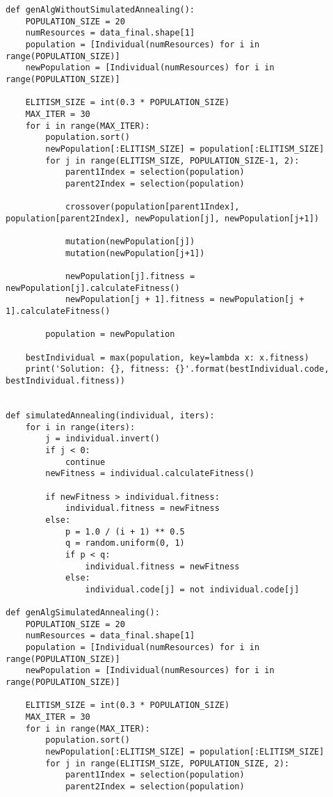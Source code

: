\documentclass[11pt]{article} %
\begin{document}
\begin{lstlisting}
def genAlgWithoutSimulatedAnnealing():
    POPULATION_SIZE = 20
    numResources = data_final.shape[1]
    population = [Individual(numResources) for i in range(POPULATION_SIZE)]
    newPopulation = [Individual(numResources) for i in range(POPULATION_SIZE)]

    ELITISM_SIZE = int(0.3 * POPULATION_SIZE)
    MAX_ITER = 30
    for i in range(MAX_ITER):
        population.sort()
        newPopulation[:ELITISM_SIZE] = population[:ELITISM_SIZE]
        for j in range(ELITISM_SIZE, POPULATION_SIZE-1, 2):
            parent1Index = selection(population)
            parent2Index = selection(population)
            
            crossover(population[parent1Index], population[parent2Index], newPopulation[j], newPopulation[j+1])

            mutation(newPopulation[j])
            mutation(newPopulation[j+1])

            newPopulation[j].fitness = newPopulation[j].calculateFitness()
            newPopulation[j + 1].fitness = newPopulation[j + 1].calculateFitness()

        population = newPopulation

    bestIndividual = max(population, key=lambda x: x.fitness)
    print('Solution: {}, fitness: {}'.format(bestIndividual.code, bestIndividual.fitness))
    
    
def simulatedAnnealing(individual, iters):
    for i in range(iters):
        j = individual.invert()
        if j < 0:
            continue
        newFitness = individual.calculateFitness()
        
        if newFitness > individual.fitness:
            individual.fitness = newFitness
        else:
            p = 1.0 / (i + 1) ** 0.5
            q = random.uniform(0, 1)
            if p < q:
                individual.fitness = newFitness
            else:
                individual.code[j] = not individual.code[j]
                
def genAlgSimulatedAnnealing():
    POPULATION_SIZE = 20
    numResources = data_final.shape[1]
    population = [Individual(numResources) for i in range(POPULATION_SIZE)]
    newPopulation = [Individual(numResources) for i in range(POPULATION_SIZE)]

    ELITISM_SIZE = int(0.3 * POPULATION_SIZE)
    MAX_ITER = 30
    for i in range(MAX_ITER):
        population.sort()
        newPopulation[:ELITISM_SIZE] = population[:ELITISM_SIZE]
        for j in range(ELITISM_SIZE, POPULATION_SIZE, 2):
            parent1Index = selection(population)
            parent2Index = selection(population)


\end{lstlisting}
\end{document}
